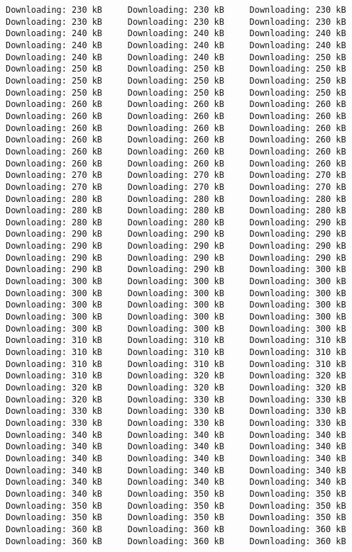 \documentclass[
  12pt,
  portuguese,
]{report}
\begin{document}
\begin{verbatim}
Downloading: 230 kB     Downloading: 230 kB     Downloading: 230 kB     Downloading: 230 kB     Downloading: 230 kB     Downloading: 230 kB     Downloading: 240 kB     Downloading: 240 kB     Downloading: 240 kB     Downloading: 240 kB     Downloading: 240 kB     Downloading: 240 kB     Downloading: 240 kB     Downloading: 240 kB     Downloading: 250 kB     Downloading: 250 kB     Downloading: 250 kB     Downloading: 250 kB     Downloading: 250 kB     Downloading: 250 kB     Downloading: 250 kB     Downloading: 250 kB     Downloading: 250 kB     Downloading: 250 kB     Downloading: 260 kB     Downloading: 260 kB     Downloading: 260 kB     Downloading: 260 kB     Downloading: 260 kB     Downloading: 260 kB     Downloading: 260 kB     Downloading: 260 kB     Downloading: 260 kB     Downloading: 260 kB     Downloading: 260 kB     Downloading: 260 kB     Downloading: 260 kB     Downloading: 260 kB     Downloading: 260 kB     Downloading: 260 kB     Downloading: 260 kB     Downloading: 260 kB     Downloading: 270 kB     Downloading: 270 kB     Downloading: 270 kB     Downloading: 270 kB     Downloading: 270 kB     Downloading: 270 kB     Downloading: 280 kB     Downloading: 280 kB     Downloading: 280 kB     Downloading: 280 kB     Downloading: 280 kB     Downloading: 280 kB     Downloading: 280 kB     Downloading: 280 kB     Downloading: 290 kB     Downloading: 290 kB     Downloading: 290 kB     Downloading: 290 kB     Downloading: 290 kB     Downloading: 290 kB     Downloading: 290 kB     Downloading: 290 kB     Downloading: 290 kB     Downloading: 290 kB     Downloading: 290 kB     Downloading: 290 kB     Downloading: 300 kB     Downloading: 300 kB     Downloading: 300 kB     Downloading: 300 kB     Downloading: 300 kB     Downloading: 300 kB     Downloading: 300 kB     Downloading: 300 kB     Downloading: 300 kB     Downloading: 300 kB     Downloading: 300 kB     Downloading: 300 kB     Downloading: 300 kB     Downloading: 300 kB     Downloading: 300 kB     Downloading: 300 kB     Downloading: 310 kB     Downloading: 310 kB     Downloading: 310 kB     Downloading: 310 kB     Downloading: 310 kB     Downloading: 310 kB     Downloading: 310 kB     Downloading: 310 kB     Downloading: 310 kB     Downloading: 310 kB     Downloading: 320 kB     Downloading: 320 kB     Downloading: 320 kB     Downloading: 320 kB     Downloading: 320 kB     Downloading: 320 kB     Downloading: 330 kB     Downloading: 330 kB     Downloading: 330 kB     Downloading: 330 kB     Downloading: 330 kB     Downloading: 330 kB     Downloading: 330 kB     Downloading: 330 kB     Downloading: 340 kB     Downloading: 340 kB     Downloading: 340 kB     Downloading: 340 kB     Downloading: 340 kB     Downloading: 340 kB     Downloading: 340 kB     Downloading: 340 kB     Downloading: 340 kB     Downloading: 340 kB     Downloading: 340 kB     Downloading: 340 kB     Downloading: 340 kB     Downloading: 340 kB     Downloading: 340 kB     Downloading: 340 kB     Downloading: 350 kB     Downloading: 350 kB     Downloading: 350 kB     Downloading: 350 kB     Downloading: 350 kB     Downloading: 350 kB     Downloading: 350 kB     Downloading: 350 kB     Downloading: 360 kB     Downloading: 360 kB     Downloading: 360 kB     Downloading: 360 kB     Downloading: 360 kB     Downloading: 360 kB     
\end{verbatim}
\end{document}

